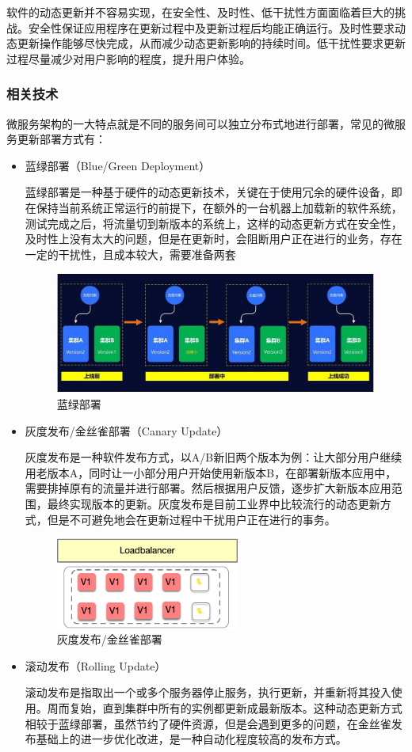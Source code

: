\documentclass[a4paper]{article}
\theoremstyle{definition}
\begin{document}
软件的动态更新并不容易实现，在安全性、及时性、低干扰性方面面临着巨大的挑战。安全性保证应用程序在更新过程中及更新过程后均能正确运行。及时性要求动态更新操作能够尽快完成，从而减少动态更新影响的持续时间。低干扰性要求更新过程尽量减少对用户影响的程度，提升用户体验。

\subsubsection{相关技术}
微服务架构的一大特点就是不同的服务间可以独立分布式地进行部署，常见的微服务更新部署方式有：
\begin{itemize}
	\item{蓝绿部署（Blue/Green Deployment）

	蓝绿部署是一种基于硬件的动态更新技术，关键在于使用冗余的硬件设备，即在保持当前系统正常运行的前提下，在额外的一台机器上加载新的软件系统，测试完成之后，将流量切到新版本的系统上，这样的动态更新方式在安全性，及时性上没有太大的问题，但是在更新时，会阻断用户正在进行的业务，存在一定的干扰性，且成本较大，需要准备两套}
	\begin{figure}[ht]
	 \centering
	 \includegraphics[height=4cm]{images/blue-green.jpeg}
	 \caption{蓝绿部署}
	 \label{fig:blue-green}
	\end{figure}

	\item{灰度发布/金丝雀部署（Canary Update）

	灰度发布是一种软件发布方式，以A/B新旧两个版本为例：让大部分用户继续用老版本A，同时让一小部分用户开始使用新版本B，在部署新版本应用中，需要排掉原有的流量并进行部署。然后根据用户反馈，逐步扩大新版本应用范围，最终实现版本的更新。灰度发布是目前工业界中比较流行的动态更新方式，但是不可避免地会在更新过程中干扰用户正在进行的事务。}
	\begin{figure}[ht]
	 \centering
	 \includegraphics[height=3cm]{images/canary.png}
	 \caption{灰度发布/金丝雀部署}
	 \label{fig:canary}
	\end{figure}

	\item{滚动发布（Rolling Update）

	滚动发布是指取出一个或多个服务器停止服务，执行更新，并重新将其投入使用。周而复始，直到集群中所有的实例都更新成最新版本。这种动态更新方式相较于蓝绿部署，虽然节约了硬件资源，但是会遇到更多的问题，在金丝雀发布基础上的进一步优化改进，是一种自动化程度较高的发布方式。}
	
\end{itemize}
\end{document}
